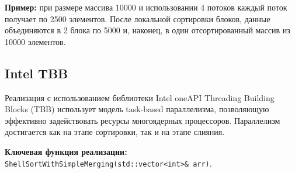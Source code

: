 \documentclass[12pt]{article}
\begin{document}
\textbf{Пример:} при размере массива 10000 и использовании 4 потоков каждый поток получает по 2500 элементов. После локальной сортировки блоков, данные объединяются в 2 блока по 5000 и, наконец, в один отсортированный массив из 10000 элементов.


\subsection{Intel TBB}

Реализация с использованием библиотеки Intel oneAPI Threading Building Blocks (TBB) использует модель task-based параллелизма, позволяющую эффективно задействовать ресурсы многоядерных процессоров. Параллелизм достигается как на этапе сортировки, так и на этапе слияния.

\textbf{Ключевая функция реализации:} \texttt{ShellSortWithSimpleMerging(std::vector<int>\& arr)}.
\end{document}

